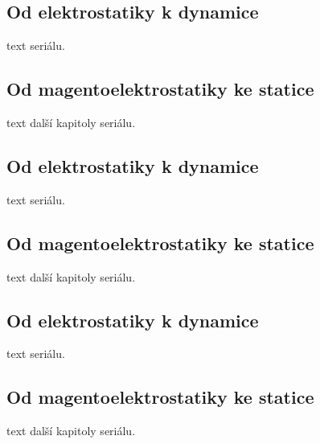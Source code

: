 \documentclass[twoside]{fksserie}
\begin{document}

\subsection{Od elektrostatiky k dynamice}
text seriálu.

\subsection{Od magentoelektrostatiky ke statice}
text další kapitoly seriálu.

\subsection{Od elektrostatiky k dynamice}
text seriálu.

\subsection{Od magentoelektrostatiky ke statice}
text další kapitoly seriálu.

\subsection{Od elektrostatiky k dynamice}
text seriálu.

\subsection{Od magentoelektrostatiky ke statice}
text další kapitoly seriálu.



\makefooter %
\end{document}
